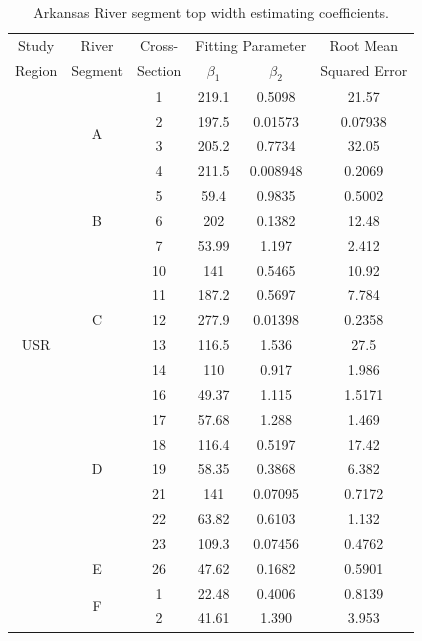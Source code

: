\begin{table}[htbp]
	\centering
	\caption[Arkansas River segment top width estimating coefficients.]{Arkansas River segment top width estimating coefficients.}
	\label{tab:alphabetavals}
	\begin{tabular}{cccccc}
		\toprule
		Study & River & Cross- & \multicolumn{2}{c}{Fitting Parameter} & Root Mean\\ \cmidrule(l{0.5em}r){4-5}
		Region & Segment & Section & $\beta_1$ & $\beta_2$ & Squared Error\\
		\toprule
		\multirow{21}{*}{USR}& \multirow{4}{*}{A} 		& 1 & 219.1	& 0.5098	& 21.57	\\
		& 						& 2 & 197.5 & 0.01573 &	0.07938 \\
		&						& 3 & 205.2 & 0.7734 & 32.05 \\
		&  						& 4 & 211.5 & 0.008948 & 0.2069 \\ \cmidrule(l{0.5em}r){2-6}
		&  \multirow{3}{*}{B} & 5 & 59.4 & 0.9835 & 0.5002 \\ 
		&						& 6 & 202 & 0.1382 & 12.48 \\ 
		&  						& 7 & 53.99 & 1.197 & 2.412 \\ \cmidrule(l{0.5em}r){2-6}
		& \multirow{5}{*}{C} & 10 & 141 & 0.5465 & 10.92 \\
		&						& 11 & 187.2 & 0.5697 & 7.784 \\
		&						& 12 & 277.9 & 0.01398 & 0.2358	\\ 
		& 						& 13 & 116.5 & 1.536 & 27.5 \\
		&						& 14 & 110 & 0.917 & 1.986 \\ \cmidrule(l{0.5em}r){2-6}
		&\multirow{7}{*}{D}	& 16 & 49.37 & 1.115 & 1.5171 \\ 
		&						& 17 & 57.68 & 1.288 & 1.469 \\
		&						& 18 &116.4 & 0.5197 & 17.42 \\
		&						& 19 & 58.35 & 0.3868 & 6.382 \\ 
		&						& 21 & 141 & 0.07095 & 0.7172 \\
		&						& 22 & 63.82 & 0.6103 & 1.132	\\
		&						& 23 & 109.3 & 0.07456 & 0.4762 \\ \cmidrule(l{0.5em}r){2-6}
		&	E				& 26 & 47.62 & 0.1682 & 0.5901 \\
		\midrule
		\multirow{13}{*}{DSR}& \multirow{7}{*}{F} & 1 & 22.48 & 0.4006 & 0.8139\\
		&						& 2 & 41.61 & 1.390 & 3.953\\

\end{tabular}
\end{table}
